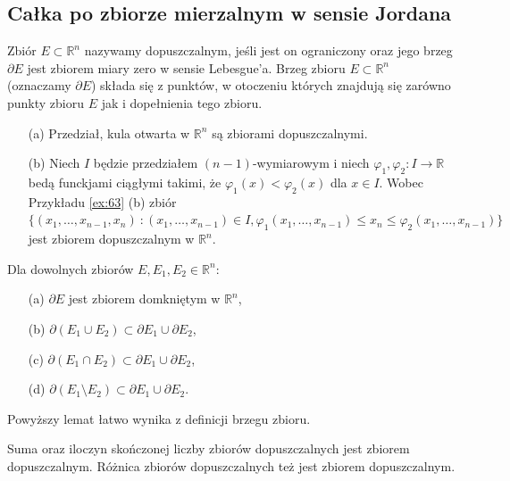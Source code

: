 \documentclass[leqno]{article}
\begin{document}
\begin{justify}
\newpage

\subsection{Całka po zbiorze mierzalnym w sensie Jordana}

\begin{defn}
    Zbiór $E \subset \mathbb{R}^n$ nazywamy dopuszczalnym, jeśli jest on ograniczony oraz jego brzeg $\partial E$ jest zbiorem miary zero w sensie Lebesgue'a. 
    Brzeg zbioru $E \subset \mathbb{R}^n$ (oznaczamy $\partial E$) składa się z punktów, w otoczeniu których znajdują się zarówno punkty zbioru $E$ jak i dopełnienia tego zbioru.
\end{defn}

\begin{ex}
    \begin{itemize}
        \item [(a)] Przedział, kula otwarta w $\mathbb{R}^n$ są zbiorami dopuszczalnymi.
        \item [(b)] Niech $I$ będzie przedziałem $(n-1)$-wymiarowym i niech $\varphi_1, \varphi_2 : I \to \mathbb{R}$ bedą 
            funckjami ciągłymi takimi, że $\varphi_1(x) < \varphi_2(x)$ dla $x \in I$. Wobec Przykładu \ref{ex:63} (b) zbiór 
            $\{(x_1, \ldots, x_{n-1}, x_n)\ : (x_1, \ldots, x_{n-1}) \in I, \varphi_1(x_1, \ldots, x_{n-1}) \leqslant x_n \leqslant \varphi_2(x_1, \ldots, x_{n-1})\}$
            jest zbiorem dopuszczalnym w $\mathbb{R}^n$.
    \end{itemize}
\end{ex}

\begin{lemat}
{
    Dla dowolnych zbiorów $E, E_1, E_2 \in \mathbb{R}^n$:
    \begin{itemize}
        \item [(a)] $\partial E$ jest zbiorem domkniętym w $\mathbb{R}^n$,
        \item [(b)] $\partial (E_1 \cup E_2) \subset \partial E_1 \cup \partial E_2$,
        \item [(c)] $\partial (E_1 \cap E_2) \subset \partial E_1 \cup \partial E_2$,
        \item [(d)] $\partial (E_1 \setminus E_2) \subset \partial E_1 \cup \partial E_2$.
    \end{itemize}
    Powyższy lemat łatwo wynika z definicji brzegu zbioru.
}
\end{lemat}

\begin{lemat}
{
    Suma oraz iloczyn skończonej liczby zbiorów dopuszczalnych jest zbiorem dopuszczalnym. Różnica zbiorów dopuszczalnych też jest zbiorem dopuszczalnym.
}
\end{lemat}


\end{justify}
\end{document}
